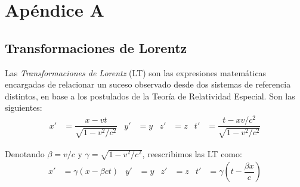 \appendix
\chapter*{Apéndice A}\label{appendix}
\setcounter{section}{0}
\renewcommand{\thesection}{A.\arabic{section}}

\section{Transformaciones de Lorentz}\label{cap:Lorentz}
Las \textit{Transformaciones de Lorentz} (LT) son las expresiones matemáticas encargadas de relacionar un suceso observado desde dos sistemas de referencia distintos, en base a los postulados de la Teoría de Relatividad Especial. Son las siguientes:
\begin{align}
x' &= \dfrac{x-vt}{\sqrt{1-v^2/c^2}} & y' &=y & z' &=z & t' &=\dfrac{t-xv/c^2}{\sqrt{1-v^2/c^2}}\label{eq:TLorentz1}
\end{align}

Denotando $\beta=v/c$ y $\gamma=\sqrt{1-v^2/c^2}$, reescribimos las LT como:
\begin{align}
x' &= \gamma(x-\beta ct) & y' &=y & z' &=z & t' &=\gamma \left(t-\dfrac{\beta x}{c}\right) \label{eq:TLorentz2}
\end{align}

